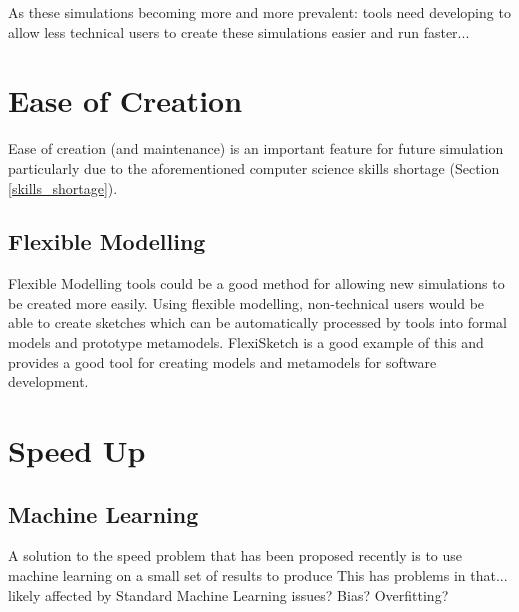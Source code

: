 \documentclass{UoYCSproject}
\begin{document}
As these simulations becoming more and more prevalent: tools need developing to allow less technical users to create these simulations easier and run faster...

\section{Ease of Creation}
Ease of creation (and maintenance) is an important feature for future simulation particularly due to the aforementioned computer science skills shortage (Section \ref{skills_shortage}).



\subsection{Flexible Modelling}
Flexible Modelling tools could be a good method for allowing new simulations to be created more easily. Using flexible modelling, non-technical users would be able to create sketches which can be automatically processed by tools into formal models and prototype metamodels\cite{Paige2017}. FlexiSketch is a good example of this and provides a good tool for creating models and metamodels for software development\cite{flexisketch}.

\section{Speed Up}

\subsection{Machine Learning}
A solution to the speed problem that has been proposed recently is to use machine learning on a small set of results to produce 
This has problems in that...
likely affected by Standard Machine Learning issues? Bias? Overfitting?
\end{document}
